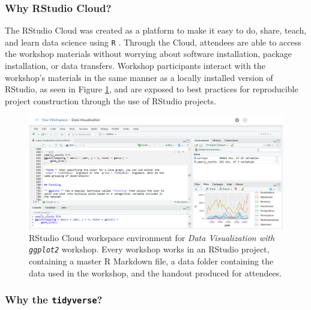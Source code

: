 \documentclass[12pt]{article}
\begin{document}
\subsubsection{Why RStudio Cloud?} 

\noindent The RStudio Cloud was created as a platform to make it easy to do,
share, teach, and learn data science using \texttt{R} \citep{RStudioCloud}. 
Through the Cloud, attendees are able to access the workshop materials without
worrying about software installation, package installation, or data transfers.
Workshop participants interact with the workshop's materials in the same manner
as a locally installed version of RStudio, as seen in Figure \ref{fig:cloud},
and are exposed to best practices for reproducible project construction through 
the use of RStudio projects. 

\begin{figure}[t!]
    \centering
    \includegraphics[width = \textwidth]{images/cloud_bigger_plot_blind.png}
    \caption{RStudio Cloud workspace environment for \emph{Data Visualization
    with \texttt{ggplot2}} workshop. Every workshop works in an RStudio project,
    containing a master R Markdown file, a data folder containing the
    data used in the workshop, and the handout produced for attendees.} 
    \label{fig:cloud}
\end{figure}

\subsubsection{Why the \texttt{tidyverse}?}
\end{document}
